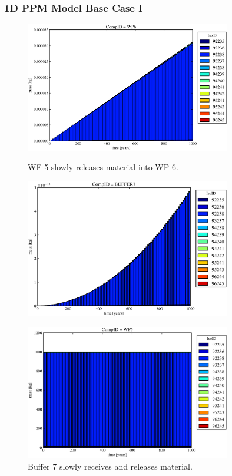 

\begin{frame}
\frametitle{1D PPM Model Base Case I}
\begin{figure}[ht]
\begin{minipage}[b]{0.45\linewidth}

  \includegraphics[width=0.8\textwidth]{./images/od2.eps}
  \caption[Case ODI Waste Form Contaminants.]{
    WF 5 slowly releases material into WP 6.
    }
  \label{fig:drIVwf5}
  \includegraphics[width=0.8\textwidth]{./images/od3.eps}
  \caption[Case ODI Buffer Contaminants]{
    Buffer 7 slowly receives and releases material.
    }
  \label{fig:drIVbuff}
\end{minipage}
\hspace{0.05\linewidth}
\begin{minipage}[b]{0.45\linewidth}
  \includegraphics[width=0.8\textwidth]{./images/od1.eps}

\end{minipage}
\end{figure}
\end{frame}
